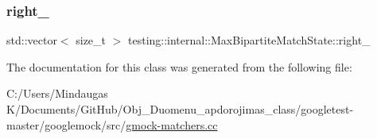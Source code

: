 \subsubsection{\texorpdfstring{right\_}{right\_}}
{\footnotesize\ttfamily std\+::vector$<$ size\+\_\+t $>$ testing\+::internal\+::\+Max\+Bipartite\+Match\+State\+::right\+\_\+\hspace{0.3cm}{\ttfamily [private]}}



The documentation for this class was generated from the following file\+:\begin{DoxyCompactItemize}
\item 
C\+:/\+Users/\+Mindaugas K/\+Documents/\+Git\+Hub/\+Obj\+\_\+\+Duomenu\+\_\+apdorojimas\+\_\+class/googletest-\/master/googlemock/src/\mbox{\hyperlink{googletest-master_2googlemock_2src_2gmock-matchers_8cc}{gmock-\/matchers.\+cc}}\end{DoxyCompactItemize}
